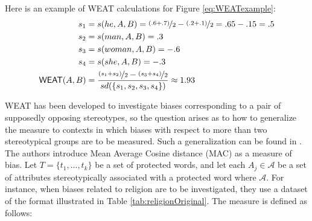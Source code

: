 \documentclass{clv3}
\begin{document}
\noindent Here is an example of \textsf{WEAT} calculations for Figure
\ref{eq:WEATexample}:
\begin{align*} s_1 & = s(he,A,B)  =  \nicefrac{(.6+.7)}{2}  - \nicefrac{(.2+.1)}{2} = .65-.15= .5 \\
s_2  & = s(man,A,B) = .3 \\
s_3  & = s(woman,A,B) = -.6\\
s_4 & = s(she, A, B) = -.3\\
\mathsf{WEAT}(A,B)  & = \frac{\nicefrac{(s_1+s_2)}{2} - \nicefrac{(s_3+s_4)}{2}}{sd(\{s_1,s_2,s_3,s_4\})} \approx 1.93
\end{align*}

\textsf{WEAT} has been developed to investigate biases corresponding to
a pair of supposedly opposing stereotypes, so the question arises as to
how to generalize the measure to contexts in which biases with respect
to more than two stereotypical groups are to be measured. Such a
generalization can be found in \citep{Manzini2019blackToCriminal}. The authors introduce Mean
Average Cosine distance (\textsf{MAC}) as a measure of bias. Let
\(T = \{t_1, \dots, t_k\}\) be a set of protected words, and let each
\(A_j\in \mathcal{A}\) be a set of attributes stereotypically associated
with a protected word where \(\mathcal{A}\). For instance, when biases
related to religion are to be investigated, they use a dataset of the
format illustrated in Table \ref{tab:religionOriginal}. The measure is
defined as follows:
\end{document}
